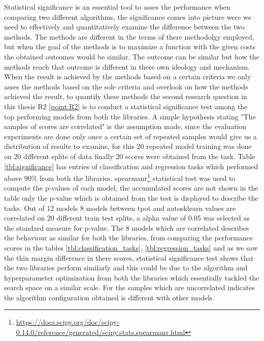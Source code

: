 Statistical significance is an essential tool to asses the performance when comparing two different algorithms, the significance comes into picture were we need to effectively and quantitatively examine the difference between the two methods. The methods are different in the terms of there methodolgy employed, but when the goal of the methods is to maximize a function with the given costs the obtained outcomes would be similar. The outcome can be similar but how the methods reach that outcome is different in there own ideology and mechanism. When the result is achieved by the methods based on a certain criteria we only asses the methods based on the sole criteria and overlook on how the methods achieved the result, to quantify these methods the second research question in this thesis R2 \ref{point:R2} is to conduct a statistical significance test among the top performing models from both the libraries. A simple hypothesis stating "The samples of scores are correlated" is the assumption made, since the evaluation experiments are done only once a certain set of repeated samples would give us a distribution of results to examine, for this 20 repeated model training was done on 20 different splits of data finally 20 scores were obtained from the task. Table \ref{tbl:significance} has entries of classification and regression tasks which performed above 90\% from both the libraries. spearmanr\footnote{\url{https://docs.scipy.org/doc/scipy-0.14.0/reference/generated/scipy.stats.spearmanr.html}} statistical test was used to compute the p-values of each model, the accumulated scores are not shown in the table only the p-value which is obtained from the test is displayed to describe the tasks. Out of 12 models 8 models between tpot and autosklearn values are correlated on 20 different train test splits, a alpha value of 0.05 was selected as the standard measure for p-value. The 8 models which are correlated describes the behaviour as similar for both the libraries, from comparing the performance scores in the tables \ref{tbl:classification_tasks}, \ref{tbl:regression_tasks} and as we saw the thin margin difference in there scores, statistical significance test shows that the two libraries perform similarly and this could be due to the algorithm and hyperparameter optimization from both the libraries which essentially tackled the search space on a similar scale. For the samples which are uncorrelated indicates the algorithm configuration obtained is different with other models.

